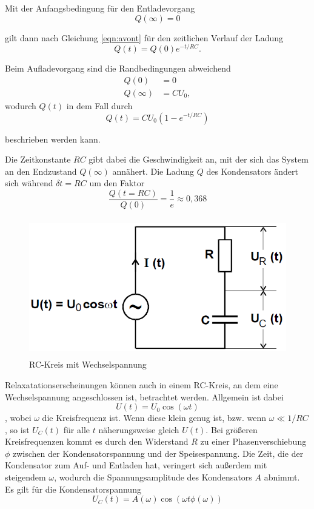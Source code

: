 Mit der Anfangsbedingung für den Entladevorgang
\begin{equation}
    Q(\infty) = 0
\end{equation}

gilt dann nach Gleichung \ref{eqn:avont} für den zeitlichen Verlauf der Ladung
\begin{equation}
    Q(t) = Q(0) e^{-t/{RC}}.
\end{equation}

Beim Aufladevorgang sind die Randbedingungen abweichend
\begin{align*}
    Q(0)        &= 0 \\
    Q(\infty)   &= CU_0 ,
\end{align*} wodurch $Q(t)$ in dem Fall durch
\begin{equation}
    Q(t) = CU_0 (1 - e^{-t/{RC}})
    \label{eqn:RC}
\end{equation}

beschrieben werden kann.

Die Zeitkonstante $RC$ gibt dabei die Geschwindigkeit an, mit der sich das System 
an den Endzustand $Q(\infty)$ annähert. Die Ladung $Q$ des Kondensators ändert sich während $\delta t=RC$ um
den Faktor
\begin{equation*}
    \frac{Q(t=RC)}{Q(0)} = \frac{1}e \approx 0,368 
\end{equation*} 


\begin{figure}
    \centering
    \includegraphics[height=6cm]{data/bild_2}
    \caption{RC-Kreis mit Wechselspannung}
    \label{fig:bild_2}
\end{figure}
\FloatBarrier
Relaxatationserscheinungen können auch in einem RC-Kreis, an dem eine Wechselspannung angeschlossen ist, betrachtet werden. 
Allgemein ist dabei \begin{equation}
    U(t) = U_0 \cos(\omega t)
\end{equation}, wobei $\omega$ die Kreisfrequenz ist. Wenn diese klein genug ist, bzw. wenn $\omega \ll 1/RC$, so ist $U_C (t)$
für alle $t$ näherungsweise gleich $U(t)$. Bei größeren Kreisfrequenzen kommt es durch den Widerstand $R$ zu einer Phasenverschiebung
$\phi$ zwischen der Kondensatorspannung und der Speisespannung. Die Zeit, die der Kondensator zum Auf- und Entladen hat, veringert sich 
außerdem mit steigendem $\omega$, wodurch die Spannungsamplitude des Kondensators $A$ abnimmt. Es gilt für die Kondensatorspannung 
\begin{equation}
    U_C (t) = A(\omega) \cos(\omega t \phi(\omega))
\end{equation}

